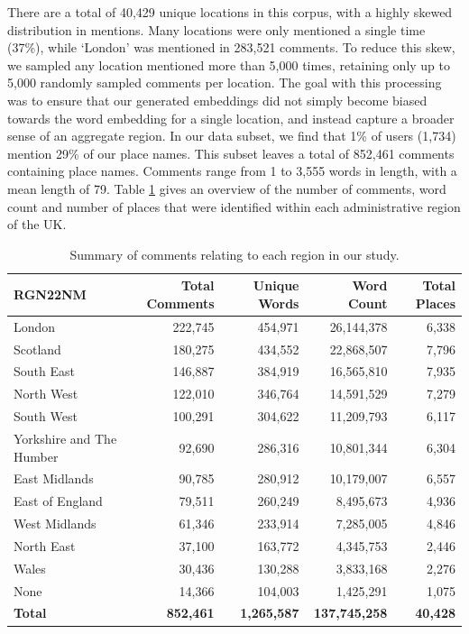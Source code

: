 \documentclass[
  letterpaper,
  11pt,
  english,
  onehalfspacing,
  headsepline]{MastersDoctoralThesis}
\begin{document}
There are a total of 40,429 unique locations in this corpus, with a
highly skewed distribution in mentions. Many locations were only
mentioned a single time (37\%), while `London' was mentioned in 283,521
comments. To reduce this skew, we sampled any location mentioned more
than 5,000 times, retaining only up to 5,000 randomly sampled comments
per location. The goal with this processing was to ensure that our
generated embeddings did not simply become biased towards the word
embedding for a single location, and instead capture a broader sense of
an aggregate region. In our data subset, we find that 1\% of users
(1,734) mention 29\% of our place names. This subset leaves a total of
852,461 comments containing place names. Comments range from 1 to 3,555
words in length, with a mean length of 79. Table \ref{tbl-sum} gives an
overview of the number of comments, word count and number of places that
were identified within each administrative region of the UK.

\begin{table}
\centering
\caption{Summary of comments relating to each region in our study.}
\label{tbl-sum}
\fontsize{9}{11}\selectfont
\begin{tabular}{lrrrr}
\toprule
\bfseries RGN22NM & \bfseries Total Comments & \bfseries Unique Words & \bfseries Word Count & \bfseries Total Places \\
\midrule
London & 222,745 & 454,971 & 26,144,378 & 6,338 \\
Scotland & 180,275 & 434,552 & 22,868,507 & 7,796 \\
South East & 146,887 & 384,919 & 16,565,810 & 7,935 \\
North West & 122,010 & 346,764 & 14,591,529 & 7,279 \\
South West & 100,291 & 304,622 & 11,209,793 & 6,117 \\
Yorkshire and The Humber & 92,690 & 286,316 & 10,801,344 & 6,304 \\
East Midlands & 90,785 & 280,912 & 10,179,007 & 6,557 \\
East of England & 79,511 & 260,249 & 8,495,673 & 4,936 \\
West Midlands & 61,346 & 233,914 & 7,285,005 & 4,846 \\
North East & 37,100 & 163,772 & 4,345,753 & 2,446 \\
Wales & 30,436 & 130,288 & 3,833,168 & 2,276 \\
None & 14,366 & 104,003 & 1,425,291 & 1,075 \\
\midrule \bfseries Total & \bfseries 852,461 & \bfseries 1,265,587 & \bfseries 137,745,258 & \bfseries 40,428 \\
\bottomrule
\end{tabular}
\end{table}
\end{document}
